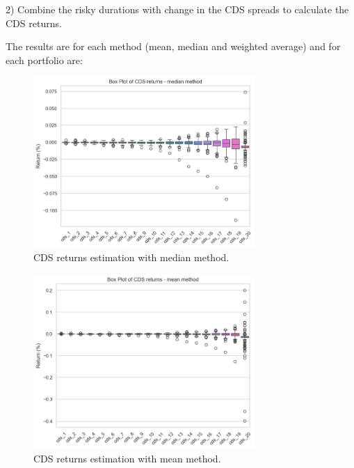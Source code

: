 \documentclass{article}
\begin{document}
\begin{Data science tools for finance final project}
2) Combine the risky durations with change in the CDS spreads to calculate the CDS returns. 

The results are for each method (mean, median and weighted average) and for each portfolio are:

\begin{figure}[H]
    \centering
    \includegraphics[width=0.75\textwidth]{../assets/cds_returns_boxplot_median.png}
    \caption{\label{fig:myplot}CDS returns estimation with median method.}
    \end{figure}

\begin{figure}[H]
    \centering
    \includegraphics[width=0.75\textwidth]{../assets/cds_returns_boxplot_allportfolios.png}
    \caption{\label{fig:myplot}CDS returns estimation with mean method.}
    \end{figure}   


\end{Data science tools for finance final project}
\end{document}
